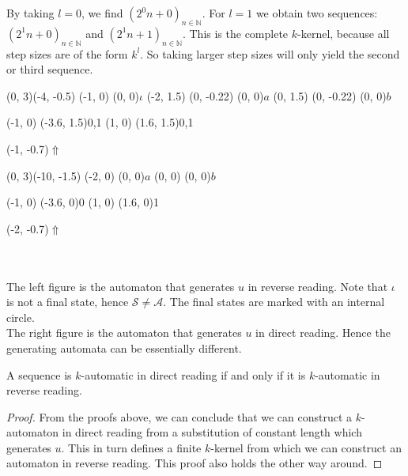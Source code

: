 \documentclass{article}
\begin{document}
By taking $l = 0$, we find $(2^0 n + 0)_{n \in \mathbb{N}}$. For $l = 1$ we
obtain two sequences: $(2^1 n + 0)_{n \in \mathbb{N}}$ and
$(2^1 n + 1)_{n \in \mathbb{N}}$. This is the complete $k$-kernel, because all 
step sizes are of the form $k^l$. So taking larger step sizes will only yield 
the second or third sequence.\\
\begin{graph}(0, 3)(-4, -0.5)
  (-1, 0) (0, 0){$\iota$}
  (-2, 1.5)
    (0, -0.22){} (0, 0){$a$}
  (0, 1.5)
    (0, -0.22){} (0, 0){$b$}

   
   
  (-1, 0) \freetext(-3.6, 1.5){0,1}
  (1, 0) \freetext(1.6, 1.5){0,1}

  \freetext(-1, -0.7){$\Uparrow$}
\end{graph}
\begin{graph}(0, 3)(-10, -1.5)
  (-2, 0) (0, 0){$a$}
  (0, 0)  (0, 0){$b$}

  (-1, 0) \freetext(-3.6, 0){0}
   
   
  (1, 0) \freetext(1.6, 0){1}

  \freetext(-2, -0.7){$\Uparrow$}
\end{graph}\\
\\
The left figure is the automaton that generates $u$ in reverse reading. Note 
that $\iota$ is not a final state, hence $\mathcal{S} \ne \mathcal{A}$. The 
final states are marked with an internal circle.\\
The right figure is the automaton that generates $u$ in direct reading. Hence
the generating automata can be essentially different.

\begin{theorem} \label{thm:directisreverse}
A sequence is $k$-automatic in direct reading if and only if it is 
$k$-automatic in reverse reading.
\end{theorem}

\begin{proof}
From the proofs above, we can conclude that we can construct 
a $k$-automaton in direct reading from a substitution of constant length which 
generates $u$.  This in turn defines a finite $k$-kernel from which we can 
construct an automaton in reverse reading. This proof also holds the other way 
around.
\end{proof}
\end{document}
